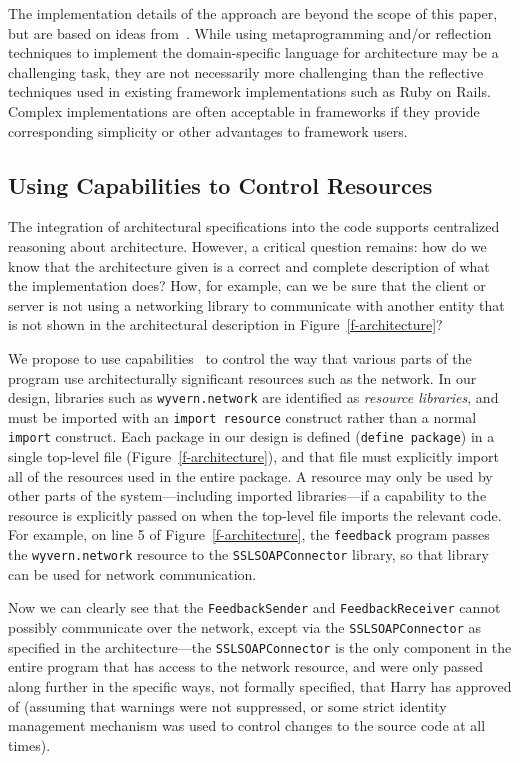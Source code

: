 \documentclass[runningheads]{llncs}
\begin{document}
\begin{sloppypar}
The implementation details of the approach are beyond the scope of this paper, but are based on ideas from~\cite{ASCN03,TSLs-ECOOP14}.  While using metaprogramming and/or reflection techniques to implement the domain-specific language for architecture may be a challenging task, they are not necessarily more challenging than the reflective techniques used in existing framework implementations such as Ruby on Rails.  Complex implementations are often acceptable in frameworks if they provide corresponding simplicity or other advantages to framework users.


\subsection{Using Capabilities to Control Resources}

The integration of architectural specifications into the code supports centralized reasoning about architecture.  However, a critical question remains: how do we know that the architecture given is a correct and complete description of what the implementation does?  How, for example, can we be sure that the client or server is not using a networking library to communicate with another entity that is not shown in the architectural description in Figure~\ref{f-architecture}?

We propose to use capabilities~\cite{Wulf:1974:HKM:355616.364017} to control the way that various parts of the program use architecturally significant resources such as the network.  In our design, libraries such as \texttt{wyvern.network} are identified as \emph{resource libraries}, and must be imported with an \texttt{import resource} construct rather than a normal \texttt{import} construct.  Each package in our design is defined (\texttt{define package}) in a single top-level file (Figure~\ref{f-architecture}), and that file must explicitly import all of the resources used in the entire package.  A resource may only be used by other parts of the system---including imported libraries---if a capability to the resource is explicitly passed on when the top-level file imports the relevant code.  For example, on line 5 of Figure~\ref{f-architecture}, the \texttt{feedback} program passes the \texttt{wyvern.network} resource to the \texttt{SSLSOAPConnector} library, so that library can be used for network communication.

Now we can clearly see that the \texttt{FeedbackSender} and \texttt{FeedbackReceiver} cannot possibly communicate over the network, except via the \texttt{SSLSOAPConnector} as specified in the architecture---the \texttt{SSLSOAPConnector} is the only component in the entire program that has access to the network resource, and were only passed along further in the specific ways, not formally specified, that Harry has approved of (assuming that warnings were not suppressed, or some strict identity management mechanism was used to control changes to the source code at all times).


\end{sloppypar}
\end{document}
